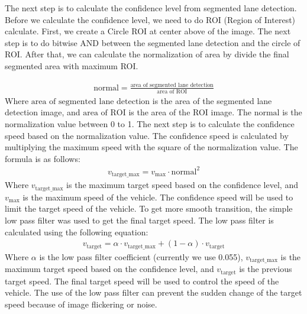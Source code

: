 \documentclass[conference]{IEEEtran}
\begin{document}
\par    
The next step is to calculate the confidence level from segmented lane detection. Before we calculate the confidence level, we need to do ROI (Region of Interest) calculate. First, we create a Circle ROI at center above of the image. The next step is to do bitwise AND between the segmented lane detection and the circle of ROI. After that, we can calculate the normalization of area by divide the final segmented area with maximum ROI. 

\begin{equation}
	\begin{aligned}
	\text{normal} = \frac{\text{area of segmented lane detection}}{\text{area of ROI}}
	\label{eq:confidence_level}
	\end{aligned}
\end{equation}
Where $\text{area of segmented lane detection}$ is the area of the segmented lane detection image, and $\text{area of ROI}$ is the area of the ROI image. The $\text{normal}$ is the normalization value between 0 to 1.
The next step is to calculate the confidence speed based on the normalization value. The confidence speed is calculated by multiplying the maximum speed with the square of the normalization value. The formula is as follows:
\begin{equation}
	\begin{aligned}
		v_{\text{target\_max}} = v_{\text{max}} \cdot \text{normal}^2
	\label{eq:confidence_speed}
	\end{aligned}
\end{equation}
Where $v_{\text{target\_max}}$ is the maximum target speed based on the confidence level, and $v_{\text{max}}$ is the maximum speed of the vehicle. The confidence speed will be used to limit the target speed of the vehicle. To get more smooth transition, the simple low pass filter was used to get the final target speed. The low pass filter is calculated using the following equation:
\begin{equation}
	\begin{aligned}
		v_{\text{target}} = \alpha \cdot v_{\text{target\_max}} + (1 - \alpha) \cdot v_{\text{target}}
	\label{eq:low_pass_filter}
	\end{aligned}
\end{equation}
Where $\alpha$ is the low pass filter coefficient (currently we use 0.055), $v_{\text{target\_max}}$ is the maximum target speed based on the confidence level, and $v_{\text{target}}$ is the previous target speed. The final target speed will be used to control the speed of the vehicle. The use of the low pass filter can prevent the sudden change of the target speed because of image flickering or noise. 
\end{document}
